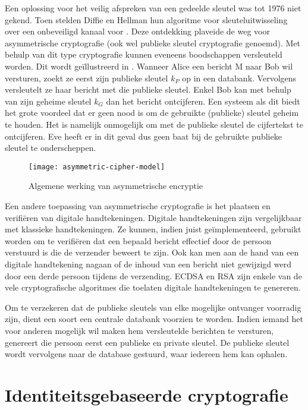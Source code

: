 Een oplossing voor het veilig afspreken van een gedeelde sleutel was tot 1976 niet gekend. Toen stelden Diffie en Hellman hun algoritme voor sleuteluitwisseling over een onbeveiligd kanaal voor \cite{diffie-hellman}. Deze ontdekking plaveide de weg voor asymmetrische cryptografie (ook wel publieke sleutel cryptografie genoemd). Met behulp van dit type cryptografie kunnen eveneens boodschappen versleuteld worden. Dit wordt ge\"illustreerd in . Wanneer Alice een bericht M naar Bob wil versturen, zoekt ze eerst zijn publieke sleutel $k_P$ op in een databank. Vervolgens versleutelt ze haar bericht met die publieke sleutel. Enkel Bob kan met behulp van zijn geheime sleutel $k_G$ dan het bericht ontcijferen. Een systeem als dit biedt het grote voordeel dat er geen nood is om de gebruikte (publieke) sleutel geheim te houden. Het is namelijk onmogelijk om met de publieke sleutel de cijfertekst te ontcijferen. Eve heeft er in dit geval dus geen baat bij de gebruikte publieke sleutel te onderscheppen. 

\begin{figure}[h]
	\centering
		 \texttt{[image: asymmetric-cipher-model]}
		 \caption{Algemene werking van asymmetrische encryptie\label{fig-encryptie-applicaties-asym-cipher}}
\end{figure}

Een andere toepassing van asymmetrische cryptografie is het plaatsen en verifi\"eren van digitale handtekeningen. Digitale handtekeningen zijn vergelijkbaar met klassieke handtekeningen. Ze kunnen, indien juist ge\-\"im\-ple\-men\-teerd, gebruikt worden om te verifi\"eren dat een bepaald bericht effectief door de persoon verstuurd is die de verzender beweert te zijn. Ook kan men aan de hand van een digitale handtekening nagaan of de inhoud van een bericht niet gewijzigd werd door een derde persoon tijdens de verzending. ECDSA \cite{ecdsa} en RSA \cite{rsa} zijn enkele van de vele cryptografische algoritmes die toelaten digitale handtekeningen te genereren.

Om te verzekeren dat de publieke sleutels van elke mogelijke ontvanger voorradig zijn, dient een soort een centrale databank voorzien te worden. Indien iemand het voor anderen mogelijk wil maken hem versleutelde berichten te versturen, genereert die persoon eerst een publieke en private sleutel. De publieke sleutel wordt vervolgens naar de database gestuurd, waar iedereen hem kan ophalen.

\section{Identiteitsgebaseerde cryptografie}

